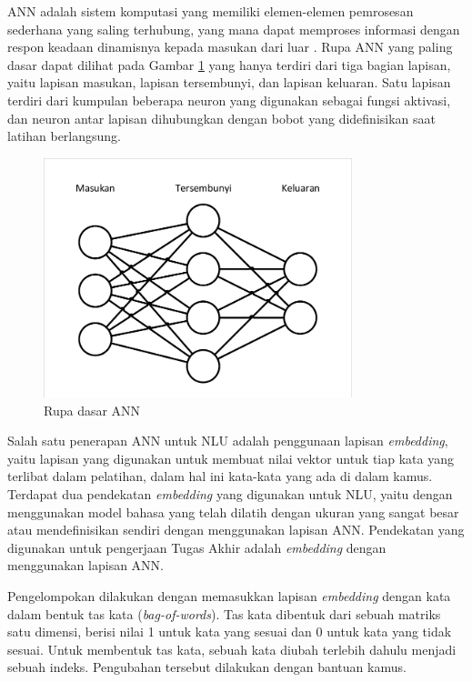 ANN adalah sistem komputasi yang memiliki elemen-elemen pemrosesan sederhana yang saling terhubung, yang mana dapat memproses informasi dengan respon keadaan dinamisnya kepada masukan dari luar \parencite{caudill1987neural}. Rupa ANN yang paling dasar dapat dilihat pada Gambar \ref{fig:ann} yang hanya terdiri dari tiga bagian lapisan, yaitu lapisan masukan, lapisan tersembunyi, dan lapisan keluaran. Satu lapisan terdiri dari kumpulan beberapa neuron yang digunakan sebagai fungsi aktivasi, dan neuron antar lapisan dihubungkan dengan bobot yang didefinisikan saat latihan berlangsung.

\begin{figure}[H]
	\centering
	\includegraphics[width=0.8\textwidth, trim=2 2 2 2, clip]{resources/2/ann.pdf}
	\caption{Rupa dasar ANN}
	\label{fig:ann}
\end{figure}

Salah satu penerapan ANN untuk NLU adalah penggunaan lapisan \textit{embedding}, yaitu lapisan yang digunakan untuk membuat nilai vektor untuk tiap kata yang terlibat dalam pelatihan, dalam hal ini kata-kata yang ada di dalam kamus. Terdapat dua pendekatan \textit{embedding} yang digunakan untuk NLU, yaitu dengan menggunakan model bahasa yang telah dilatih dengan ukuran yang sangat besar atau mendefinisikan sendiri dengan menggunakan lapisan ANN. Pendekatan yang digunakan untuk pengerjaan Tugas Akhir adalah \textit{embedding} dengan menggunakan lapisan ANN.

Pengelompokan dilakukan dengan memasukkan lapisan \textit{embedding} dengan kata dalam bentuk tas kata (\textit{bag-of-words}). Tas kata dibentuk dari sebuah matriks satu dimensi, berisi nilai 1 untuk kata yang sesuai dan 0 untuk kata yang tidak sesuai. Untuk membentuk tas kata, sebuah kata diubah terlebih dahulu menjadi sebuah indeks. Pengubahan tersebut dilakukan dengan bantuan kamus.


